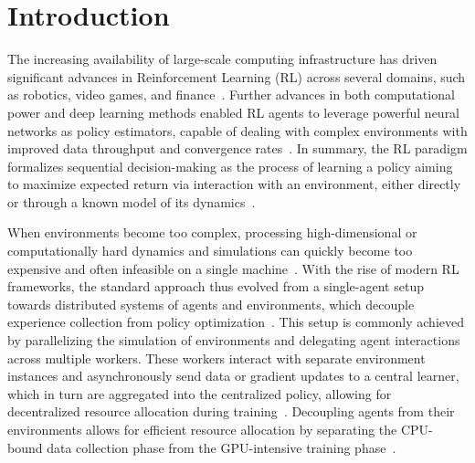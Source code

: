 
\chapter{Introduction}
\label{ch:introduction}

The increasing availability of large-scale computing infrastructure has driven significant advances
in Reinforcement Learning (RL) across several domains, such as robotics, video games, and finance~\citep{Yin2024,Hou2025,Huh2023}.
Further advances in both computational power and deep learning methods enabled RL agents to leverage powerful neural networks
as policy estimators, capable of dealing with complex environments with improved data 
throughput and convergence rates~\citep{Zheng2023,Jia2024}.
In summary, the RL paradigm formalizes sequential decision-making as the process of learning a policy aiming to maximize expected return
via interaction with an environment, either directly or through a known model of its dynamics~\citep{Zhu2022}.

When environments become too complex, processing high-dimensional or computationally hard dynamics and simulations
can quickly become too expensive and often infeasible on a single machine~\citep{Goudarzi2023,Fan2024}.
With the rise of modern RL frameworks, the standard approach thus evolved from a single-agent setup towards
distributed systems of agents and environments, which decouple experience collection from policy optimization~\citep{Furukawa2022,Kopic2024}.
This setup is commonly achieved by parallelizing the simulation of environments and delegating agent interactions across multiple workers.
These workers interact with separate environment instances and asynchronously send data or gradient updates to a central learner,
which in turn are aggregated into the centralized policy, allowing for decentralized resource allocation during training~\citep{Cho2023}.
Decoupling agents from their environments allows for efficient resource allocation by separating the CPU-bound data collection phase from the GPU-intensive training phase~\citep{Fayaz2022,Lu2021}.


